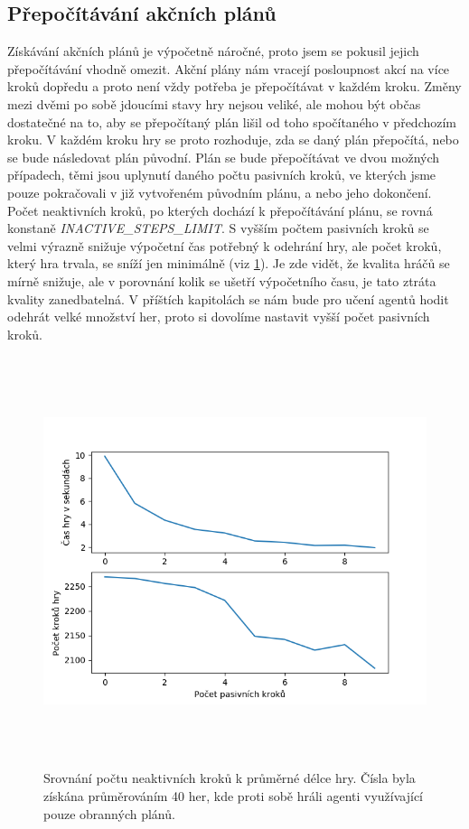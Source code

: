 \subsection{Přepočítávání akčních plánů}
Získávání akčních plánů je výpočetně náročné, proto jsem se pokusil jejich přepočítávání vhodně omezit. Akční plány nám vracejí posloupnost akcí na více kroků dopředu a proto není vždy potřeba je přepočítávat v každém kroku.
Změny mezi dvěmi po sobě jdoucími stavy hry nejsou veliké, ale mohou být občas dostatečné na to, aby se přepočítaný plán lišil od toho spočítaného v předchozím kroku.
V každém kroku hry se proto rozhoduje, zda se daný plán přepočítá, nebo se bude následovat plán původní. 
Plán se bude přepočítávat ve dvou možných případech, těmi jsou uplynutí daného počtu pasivních kroků, ve kterých jsme pouze pokračovali v již vytvořeném původním plánu, a nebo jeho dokončení.
Počet neaktivních kroků, po kterých dochází k přepočítávání plánu, se rovná konstaně \emph{\uppercase{inactive\_steps\_limit}}. 
S vyšším počtem pasivních kroků se velmi výrazně snižuje výpočetní čas potřebný k odehrání hry, ale počet kroků, který hra trvala, se sníží jen minimálně (viz \ref{obr03:}).
Je zde vidět, že kvalita hráčů se mírně snižuje, ale v porovnání kolik se ušetří výpočetního času, je tato ztráta kvality zanedbatelná.
V příštích kapitolách se nám bude pro učení agentů hodit odehrát velké množství her, proto si dovolíme nastavit vyšší počet pasivních kroků.


\begin{figure}[hp]

\includegraphics[width=145mm, height=120mm]{./Obrazky/Inactive_steps_comparison2.png}
\caption{Srovnání počtu neaktivních kroků k průměrné délce hry. Čísla byla získána průměrováním 40 her, kde proti sobě hráli agenti využívající pouze obranných plánů.}
\label{obr03:}
\end{figure}

